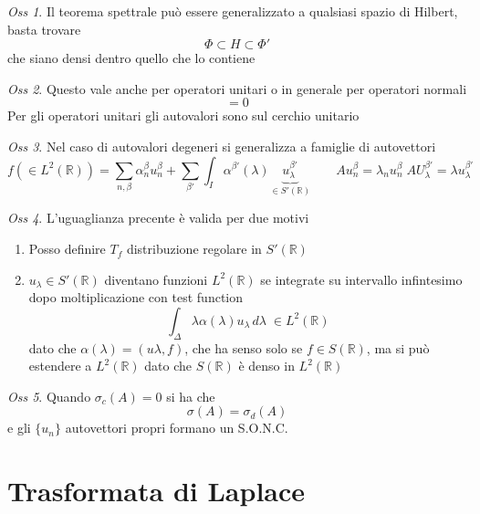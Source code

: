 \documentclass[a4paper,11pt]{report}
\theoremstyle{remark}
\newtheorem*{oss}{Oss}
\theoremstyle{definition}
\newcommand{\R}{\mathbb{R}}
\begin{document}
\begin{oss}
	Il teorema spettrale può essere generalizzato a qualsiasi spazio di Hilbert, basta trovare 
	\begin{equation*}
		\varPhi \subset H \subset \varPhi'
	\end{equation*} 
	che siano densi dentro quello che lo contiene
\end{oss}
\begin{oss}
	Questo vale anche per operatori unitari o in generale per operatori normali 
	\begin{equation*}
		[T,T^+] = 0
	\end{equation*}
	Per gli operatori unitari gli autovalori sono sul cerchio unitario
\end{oss}
\begin{oss}
	Nel caso di autovalori degeneri si generalizza a famiglie di autovettori
	\begin{equation*}
		f (\in L^2(\R)) = \sum_{n,\beta} \alpha^\beta_n u^\beta_n + \sum_{\beta'} \int_I \alpha^{\beta'}(\lambda)\underbrace{u^{\beta'}_\lambda}_{\in S'(\R)} \qquad Au^\beta_n = \lambda_n u^\beta_n \; A U^{\beta'}_\lambda = \lambda u^{\beta'}_\lambda
	\end{equation*}
\end{oss}
\begin{oss}
	L'uguaglianza precente è valida per due motivi
	\begin{enumerate}
		\item Posso definire $T_f$ distribuzione regolare in $S'(\R)$
		\item $u_\lambda \in S'(\R)$ diventano funzioni $L^2(\R)$ se integrate su intervallo infintesimo dopo moltiplicazione con test function
		\begin{equation*}
			\int_\Delta \lambda\alpha(\lambda) u_\lambda \, d\lambda \; \in L^2(\R)
		\end{equation*}
		dato che $\alpha(\lambda) = (u\lambda, f)$, che ha senso solo se $f\in S(\R)$, ma si può estendere a $L^2(\R)$ dato che $S(\R)$ è denso in $L^2(\R)$
	\end{enumerate}
\end{oss}
\begin{oss}
	Quando $\sigma_c(A) = 0$ si ha che 
	\begin{equation*}
		\sigma(A) = \sigma_d(A)
	\end{equation*}
	e gli $\{u_n\}$ autovettori propri formano un S.O.N.C.
\end{oss}

\chapter{Trasformata di Laplace}
\end{document}
